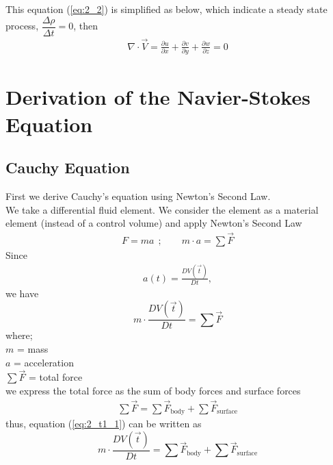 \documentclass[11pt]{report}
\newcommand{\spn}[1]{\\[#1cm]}
\newcommand{\refn}[1]{(\ref{#1})}
\newcommand{\refx}[1]{\refn{eq:#1}}
\begin{document}
	This equation \refx{2_2} is simplified as below, which indicate a steady state process, $\dfrac{\Delta \rho}{\Delta t} = 0$, then 
	\begin{eqnarray*}
		\nabla \cdot \vec{V} = \frac{\partial u}{\partial x} + \frac{\partial v}{\partial y} + \frac{\partial w}{\partial z} = 0
	\end{eqnarray*}
	
	\section{Derivation of the Navier-Stokes Equation}
	\subsection{Cauchy Equation}
	First we derive Cauchy's equation using Newton's Second Law.\\
	We take a differential fluid element. We consider the element as a material element (instead of a control volume) and apply Newton's Second Law
	\begin{eqnarray*}
		F = ma~~;\qquad m \cdot a = \sum \vec{F}
	\end{eqnarray*}
	Since
	\begin{eqnarray*}
		a(t) = \frac{DV(\vec{t})}{Dt},
	\end{eqnarray*}
	we have
	\begin{equation}
		m \cdot \frac{DV(\vec{t})}{Dt} = \sum \vec{F}\tag{1}\label{eq:2_t1_1}
	\end{equation}
	where;\\
	\hspace*{1cm}$m$ = mass\\
	\hspace*{1cm}$a$ = acceleration\\
	\hspace*{1cm}$\sum \vec{F}$ = total force\\
	we express the total force as the sum of body forces and surface forces
	\begin{eqnarray*}
		\sum \vec{F} = \sum \vec{F}_{\text{body}} + \sum \vec{F}_{\text{surface}}
	\end{eqnarray*}
	thus, equation \refx{2_t1_1} can be written as
	\begin{equation}
			m \cdot \frac{DV(\vec{t})}{Dt} = \sum \vec{F}_{\text{body}} + \sum \vec{F}_{\text{surface}}\tag{2}\label{eq:2_t1_2}
	\end{equation}
	{~}\spn{0.4}
\end{document}
